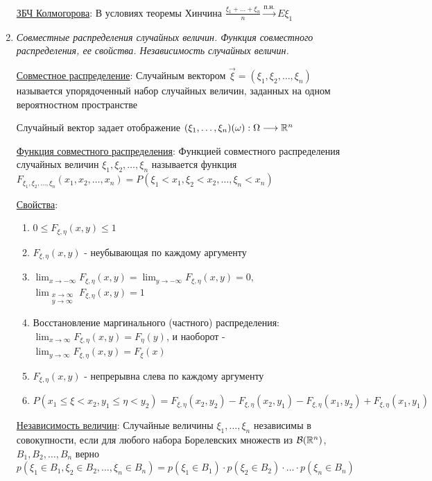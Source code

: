 \documentclass[12pt]{article}
\begin{document}
\begin{enumerate}
    \hyperlink{lawofbignumberskolmogorov}{ЗБЧ Колмогорова}: В условиях теоремы Хинчина $\frac{\xi_1 + \dots + \xi_n}{n} \overset{\text{п.н.}}{\longrightarrow} E\xi_1$

    \item \textit{Совместные распределения случайных величин. Функция совместного распределения, ее свойства. Независимость случайных величин.}
    
    \hyperlink{jointdistribution}{Совместное распределение}: Случайным вектором $\vec{\xi} = (\xi_1, \xi_2, \dots, \xi_n)$ называется упорядоченный набор случайных величин, заданных
    на одном вероятностном пространстве

    Случайный вектор задает отображение $(\xi_1, \dots, \xi_n) (\omega) : \Omega \longrightarrow \mathbb{R}^n$

    \hyperlink{jointdistributionfunction}{Функция совместного распределения}: Функцией совместного распределения случайных величин $\xi_1, \xi_2, \dots, \xi_n$ называется функция 
    $F_{\xi_1, \xi_2, \dots, \xi_n}(x_1, x_2, \dots, x_n) = P(\xi_1 < x_1, \xi_2 < x_2, \dots, \xi_n < x_n)$

    \hyperlink{jointdistributionfunctionproperties}{Свойства}: 

    \begin{enumerate}
        \item $0 \leq F_{\xi, \eta}(x, y) \leq 1$
        \item $F_{\xi, \eta}(x, y)$ - неубывающая по каждому аргументу
        \item $\lim_{x \to -\infty} F_{\xi, \eta}(x, y) = \lim_{y \to -\infty} F_{\xi, \eta}(x, y) = 0, $
        $\lim_{\substack{x \to \infty \\ y \to \infty}} F_{\xi, \eta}(x, y) = 1$

        \item Восстановление маргинального (частного) распределения: 
        $\lim_{x \to \infty} F_{\xi, \eta}(x, y) = F_\eta(y)$, и наоборот - $\lim_{y \to \infty} F_{\xi, \eta}(x, y) = F_\xi(x)$

        \item $F_{\xi, \eta}(x, y)$ - непрерывна слева по каждому аргументу

        \item $P(x_1 \leq \xi < x_2, y_1 \leq \eta < y_2) = F_{\xi, \eta}(x_2, y_2) - F_{\xi, \eta}(x_2, y_1) - F_{\xi, \eta}(x_1, y_2) + F_{\xi, \eta}(x_1, y_1)$
    \end{enumerate}

    \hyperlink{randomvariablesindependence}{Независимость величин}: Случайные величины $\xi_1, \dots, \xi_n$ независимы в совокупности, если для любого набора Борелевских множеств из
    $\mathcal{B}(\mathbb{R}^n)$, $B_1, B_2, \dots, B_n$ верно $p(\xi_1 \in B_1, \xi_2 \in B_2, \dots, \xi_n \in B_n) = p(\xi_1 \in B_1) \cdot p(\xi_2 \in B_2) \cdot \dots \cdot p(\xi_n \in B_n)$


\end{enumerate}
\end{document}
